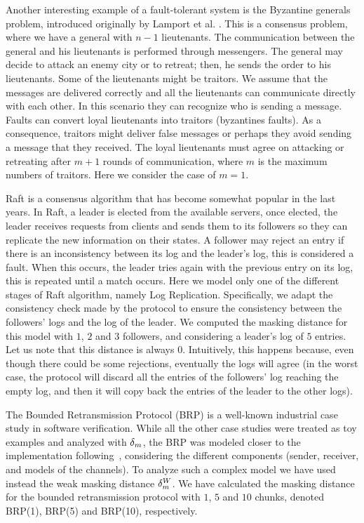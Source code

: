 Another interesting example of a fault-tolerant system is the Byzantine generals problem, introduced originally by Lamport et al. \cite{LamportSP82}. This is a consensus problem, where we have a general with $n-1$ lieutenants. The communication between the general and his lieutenants is performed through messengers. The general may decide to attack an enemy city or to retreat; then, he sends the order to his lieutenants. Some of the lieutenants might be traitors. 
We assume that the messages are delivered correctly and all the lieutenants can communicate directly with each other. In this scenario they can recognize who is sending a message. Faults can convert loyal lieutenants into traitors (byzantines faults). As a consequence, traitors might deliver false messages or perhaps they avoid sending a message that they received. The loyal lieutenants must agree on attacking or retreating after $m + 1$ rounds of communication, where $m$ is the maximum numbers of traitors. Here we consider the case of $m=1$.  


Raft \cite{OngaroO14} is a consensus algorithm that has become somewhat popular in the last years. In Raft, a leader is elected from the available servers, once elected, the leader receives requests from clients and sends them to its followers so they can replicate the new information on their states. A follower may reject an entry if there is an inconsistency between its log and the leader's log, this is considered  a fault. When this occurs, the leader tries again with the previous entry on its log, this is repeated until a match occurs. Here we model only one of the different stages of Raft algorithm, namely Log Replication. Specifically, we adapt the consistency check  made by the protocol to ensure the consistency between  the followers' logs and the log of the  leader.  We computed the masking distance for this model with $1$, $2$ and $3$ followers, and considering a leader's log of $5$ entries. Let us note that this distance  is always $0$. Intuitively, this happens because, even though there could be some rejections, eventually the logs will agree (in the worst case, the protocol will discard all the entries of the followers' log reaching the empty log, and then it will copy back the entries of the leader to the other logs). 

The Bounded Retransmission Protocol (BRP) is a well-known industrial
case study in software verification.
While all the other case studies were treated as toy examples and analyzed with $\delta_{m}$, the BRP was modeled closer to the implementation following~\cite{GrooteP96}, considering the different components (sender, receiver, and models of the channels).  To analyze such a complex model we have used instead the weak masking distance $\delta_{m}^W$.
We have calculated the masking distance for the bounded retransmission protocol with $1$, $5$ and $10$ chunks, denoted BRP(1), BRP(5) and BRP(10), respectively. 

